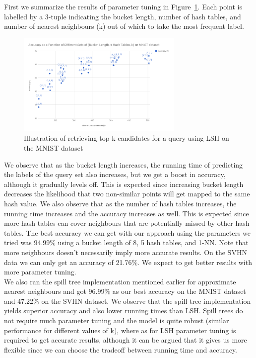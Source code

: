 \documentclass[letterpaper,twocolumn,10pt]{article}
\theoremstyle{definition}
\begin{document}
First we summarize the results of parameter tuning in Figure~\ref{figure:tuning}. Each 
point is labelled by a 3-tuple indicating the bucket length, number of hash tables, and number of 
nearest neighbours (k) out of which to take the most frequent label.

\begin{figure}[t]
	\center
	\includegraphics[width=8cm]{param-tuning.png}
	\caption{Illustration of retrieving top k candidates for a query using LSH on the MNIST dataset}
	\label{figure:tuning}
\end{figure}

We observe that as the bucket length increases, the running time of predicting the labels of the query 
set also increases, but we get a boost in accuracy, although it gradually levels off. This is expected 
since increasing bucket length decreases the likelihood that two non-similar points will get mapped to 
the same hash value. We also observe that as the number of hash tables increases, the running time 
increases and the accuracy increases as well. This is expected since more hash tables can cover 
neighbours that are potentially missed by other hash tables. The best accuracy we can get with our 
approach using the parameters we tried was 94.99\% using a bucket length of 8, 5 hash tables, and 
1-NN. 
Note that more neighbours doesn't necessarily imply more accurate results. On the SVHN data we can 
only get an accuracy of 21.76\%. We expect to get better results with more parameter tuning. \\

We also ran the spill tree implementation mentioned earlier for approximate nearest neighbours and got 
96.99\% as our best accuracy on the MNIST dataset and 47.22\% on the SVHN dataset. We observe 
that the spill tree implementation yields superior accuracy and also lower running times than LSH. Spill 
trees do not require much parameter tuning and the model is quite robust (similar performance for 
different values of k), where as for LSH parameter tuning is required to get accurate results, although 
it can be argued that it gives us more flexible since we can choose the tradeoff between running time 
and accuracy. \\
\end{document}

